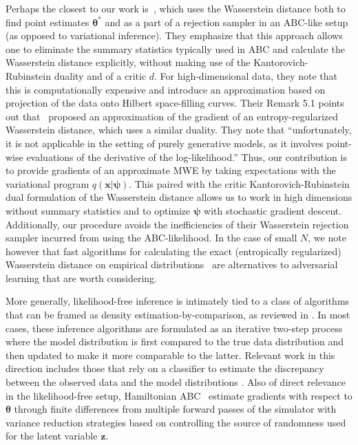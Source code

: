 \documentclass{article}
\newcommand{\bftheta}{{\bm \theta}}
\newcommand{\bfpsi}{{\bm \psi}}
\newcommand{\bfx}{\mathbf{x}}
\newcommand{\bfz}{\mathbf{z}}
\theoremstyle{plain}
\begin{document}
Perhaps the closest to our work is~\cite{bernton2017inference}, which uses the
Wasserstein distance both to find point estimates $\bftheta^*$ and as a part of
a rejection sampler in an ABC-like setup (as opposed to variational inference).
They emphasize that this approach allows one to eliminate the summary statistics
typically used in ABC and calculate the Wasserstein distance explicitly, without
making use of the Kantorovich-Rubinstein duality and of a critic $d$. For high-dimensional
data, they note that this is computationally expensive and introduce an
approximation based on projection of the data onto Hilbert space-filling curves.
Their Remark 5.1 points out that~\cite{montavon2016wasserstein} proposed an
approximation of the gradient of an entropy-regularized Wasserstein distance,
which uses a similar duality. They note that ``unfortunately, it is not
applicable in the setting of purely generative models, as it involves point-wise
evaluations of the derivative of the log-likelihood.'' Thus, our contribution is
to provide gradients of an approximate MWE by taking expectations with the
variational program $q(\bfx | \bfpsi)$. This paired with the critic
Kantorovich-Rubinstein dual formulation of the Wasserstein distance
allows us to work in high dimensions without summary statistics and to
optimize $\bfpsi$ with stochastic gradient descent. Additionally,
our procedure avoids the inefficiencies of
their Wasserstein rejection sampler incurred from using the ABC-likelihood.
In the case of small $N$, we note however that fast algorithms for calculating the exact (entropically regularized) Wasserstein distance on
empirical distributions~\cite{cuturi2013sinkhorn, genevay2016stochastic, montavon2016wasserstein}
are alternatives to adversarial learning that are worth considering.

More generally, likelihood-free
inference is intimately tied to a class of algorithms that can be framed as
density estimation-by-comparison, as reviewed in \cite{2016arXiv161003483M}. In most cases, these
inference algorithms are formulated as an iterative two-step process where the
model distribution is first compared to the true data distribution and then
updated to make it more comparable to the latter. Relevant work in this
direction includes those that rely on a classifier to estimate the discrepancy between the observed data and the model distributions
\cite{gutmann2012noise,cranmer2015approximating,cranmer2016experiments,2016arXiv161110242D,gutmann2017likelihood,rosca2017variational}.
Also of direct relevance in the likelihood-free setup, Hamiltonian ABC~\cite{meeds2015hamiltonian}
estimate gradients with respect
to $\bftheta$ through finite differences from multiple forward passes of the
simulator with variance reduction strategies based on controlling the source of
randomness used for the latent variable $\bfz$.
\end{document}
